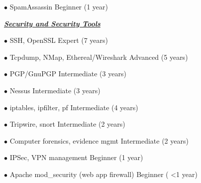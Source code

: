 \documentclass{article}
\newcommand{\skillset}[1]{{ \underline{\textbf{\emph{#1}}}\\  \nopagebreak }}
\newcommand{\skill}[2]{{$\bullet$ #1 \hfill #2 }}
\begin{document}
\skill{SpamAssassin}{Beginner (1 year)}


\skillset{Security and Security Tools}

\skill{SSH, OpenSSL}{Expert (7 years)}

\skill{Tcpdump, NMap, Ethereal/Wireshark}{Advanced (5 years)}

\skill{PGP/GnuPGP}{Intermediate (3 years)}

\skill{Nessus}{Intermediate (3 years)}

\skill{iptables, ipfilter, pf}{Intermediate (4 years)}

\skill{Tripwire, snort}{Intermediate (2 years)}

\skill{Computer forensics, evidence mgmt}{Intermediate (2 years)}

\skill{IPSec, VPN management}{Beginner (1 year)}

\skill{Apache mod\_security (web app firewall)}{Beginner ( \textless 1 year)}
\end{document}
